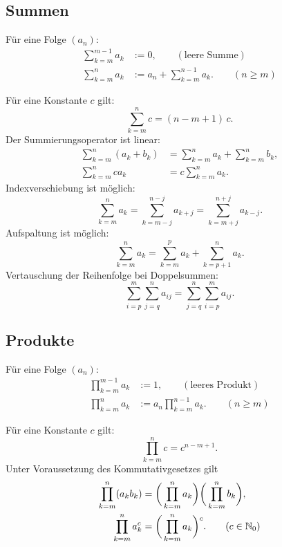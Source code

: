 \subsection{Summen}
\begin{definition}[Summe]
Für eine Folge $(a_n)$:
\begin{align}
\sum_{k=m}^{m-1} a_k &:= 0,\qquad(\text{leere Summe})\\
\sum_{k=m}^n a_k &:= a_n+\sum_{k=m}^{n-1} a_k.\qquad(n\ge m)
\end{align}
\end{definition}
\noindent
Für eine Konstante $c$ gilt:
\begin{equation}
\sum_{k=m}^n c = (n-m+1)\,c.
\end{equation}
Der Summierungsoperator ist linear:
\begin{align}
\sum_{k=m}^n (a_k+b_k) &= \sum_{k=m}^n a_k + \sum_{k=m}^n b_k,\\
\sum_{k=m}^n ca_k &= c\sum_{k=m}^n a_k.
\end{align}
Indexverschiebung ist möglich:
\begin{equation}
\sum_{k=m}^n a_k = \sum_{k=m-j}^{n-j} a_{k+j} = \sum_{k=m+j}^{n+j} a_{k-j}.
\end{equation}
Aufspaltung ist möglich:
\begin{equation}
\sum_{k=m}^n a_k = \sum_{k=m}^p a_k + \sum_{k=p+1}^n a_k.
\end{equation}
Vertauschung der Reihenfolge bei Doppelsummen:
\begin{equation}
\sum_{i=p}^m \sum_{j=q}^n a_{ij} = \sum_{j=q}^n \sum_{i=p}^m a_{ij}.
\end{equation}

\subsection{Produkte}
\begin{definition}[Produkt]
Für eine Folge $(a_n)$:
\begin{align}
\prod_{k=m}^{m-1} a_k &:= 1,\qquad(\text{leeres Produkt})\\
\prod_{k=m}^n a_k &:= a_n\prod_{k=m}^{n-1} a_k.\qquad(n\ge m)
\end{align}
\end{definition}

\noindent
Für eine Konstante $c$ gilt:
\begin{equation}
\prod_{k=m}^n c = c^{n-m+1}.
\end{equation}
Unter Voraussetzung des Kommutativgesetzes gilt
\begin{align}
\label{eq:product-product}
\prod_{k=m}^n (a_k b_k) &= \bigg(\prod_{k=m}^n a_k\bigg)\bigg(\prod_{k=m}^n b_k\bigg),\\
\label{eq:product-power}
\prod_{k=m}^n a_k^c &= \bigg(\prod_{k=m}^n a_k\bigg)\Big.^c.\qquad (c\in\mathbb N_0)
\end{align}

